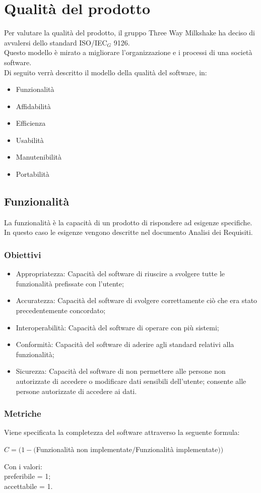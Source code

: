 \section{Qualità del prodotto}
Per valutare  la qualità del prodotto, il gruppo Three Way Milkshake ha deciso di avvalersi dello standard ISO/IEC$_G$ 9126.\\
Questo modello è mirato a  migliorare l'organizzazione e i processi di una società software.\\
Di seguito verrà descritto il modello della qualità del software, in:
\begin{itemize}
	\item Funzionalità
	\item Affidabilità
	\item Efficienza
	\item Usabilità
	\item Manutenibilità
	\item Portabilità
\end{itemize}

\subsection{Funzionalità}
La funzionalità è la capacità di un prodotto di rispondere ad esigenze specifiche.\\
In questo caso le esigenze vengono descritte nel documento Analisi dei Requisiti.
\subsubsection{Obiettivi}
\begin{itemize}
	\item Appropriatezza: Capacità del software di riuscire a svolgere tutte le funzionalità prefissate con l'utente;
	\item Accuratezza: Capacità del software di svolgere correttamente ciò che era stato precedentemente concordato;
	\item Interoperabilità: Capacità del software di operare con più sistemi;
	\item Conformità: Capacità del software di aderire agli standard relativi alla funzionalità;
	\item Sicurezza: Capacità del software di non permettere alle persone non autorizzate di accedere o modificare dati sensibili dell'utente; consente alle persone autorizzate di accedere ai dati.
\end{itemize}

\subsubsection{Metriche}
Viene specificata la completezza del software attraverso la seguente formula:
\begin{center}
	$C = (1-($Funzionalità non implementate$ / $Funzionalità implementate$))$
\end{center}
Con i valori:\\
preferibile = 1;\\
accettabile = 1.


